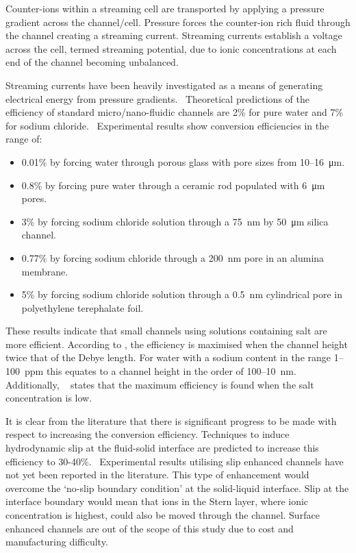 \documentclass[10pt,final,journal]{IEEEtran}
\begin{document}
    Counter-ions within a streaming cell are transported by applying a pressure gradient across the channel/cell.
    Pressure forces the counter-ion rich fluid through the channel creating a streaming current.
    Streaming currents establish a voltage across the cell, termed streaming potential, due to ionic concentrations at each end of the channel becoming unbalanced.

    Streaming currents have been heavily investigated as a means of generating electrical energy from pressure gradients.~\cite{Chang2009,Daiguji2006,Daiguji2004b,Davidson2008a,Davidson2008,CherngHon2012,Jiao2014,Lu2006,Olthuis2005,Osterle1964,Pennathur2007,Ren2008a,VanderHeyden2006,Heyden2007,Xie2008,Yang2003}
    Theoretical predictions of the efficiency of standard micro/nano-fluidic channels are 2\% for pure water and 7\% for sodium chloride.~\cite{VanderHeyden2006}
    Experimental results show conversion efficiencies in the range of:
    \begin{itemize}
        \item 0.01\% by forcing water through porous glass with pore sizes from 10\thinspace--\SI{16}{\micro\metre}.~\cite{Yang2003}
        \item 0.8\% by forcing pure water through a ceramic rod populated with \SI{6}{\micro\metre} pores.~\cite{Yang2004}
        \item 3\% by forcing sodium chloride solution through a \SI{75}{\nano\metre} by \SI{50}{\micro\metre} silica channel.~\cite{Heyden2007}
        \item 0.77\% by forcing sodium chloride through a \SI{200}{\nano\metre} pore in an alumina membrane.~\cite{Lu2006}
        \item 5\% by forcing sodium chloride solution through a \SI{0.5}{\nano\metre} cylindrical pore in polyethylene terephalate foil.~\cite{Xie2008}
    \end{itemize}
    These results indicate that small channels using solutions containing salt are more efficient.
    According to \cite{Daiguji2004b}, the efficiency is maximised when the channel height twice that of the Debye length.
    For water with a sodium content in the range 1--100~ppm this equates to a channel height in the order of 100--10~nm.
    Additionally, ~\cite{VanderHeyden2006} states that the maximum efficiency is found when the salt concentration is low.


    It is clear from the literature that there is significant progress to be made with respect to increasing the conversion efficiency.
    Techniques to induce hydrodynamic slip at the fluid-solid interface are predicted to increase this efficiency to 30-40\%.~\cite{Davidson2008a, Ren2008a}
    Experimental results utilising slip enhanced channels have not yet been reported in the literature.
    This type of enhancement would overcome the `no-slip boundary condition' at the solid-liquid interface.
    Slip at the interface boundary would mean that ions in the Stern layer, where ionic concentration is highest, could also be moved through the channel.
    Surface enhanced channels are out of the scope of this study due to cost and manufacturing difficulty.
\end{document}
